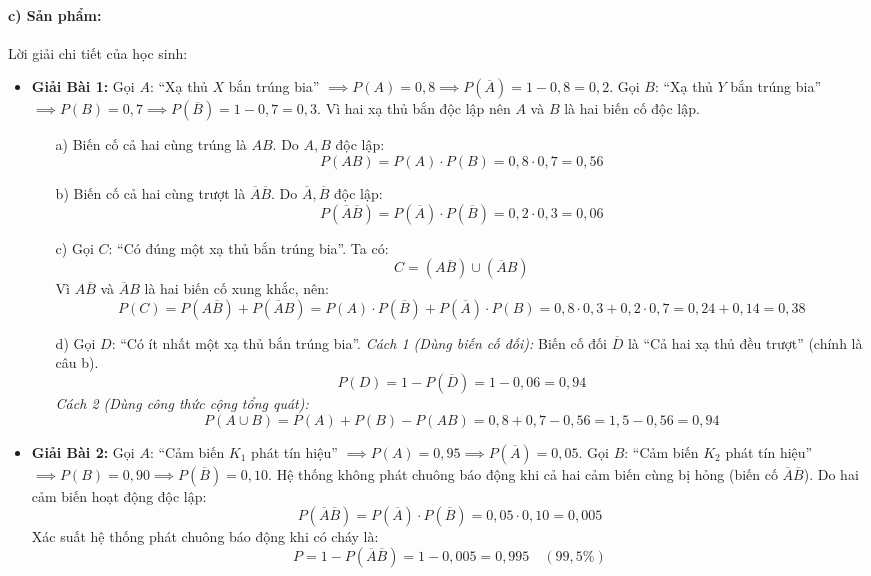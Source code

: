 \documentclass[12pt, a4paper]{article}
\begin{document}
\paragraph{c) Sản phẩm:} Lời giải chi tiết của học sinh:
\begin{itemize}[leftmargin=0.8cm]
    \item \textbf{Giải Bài 1:}
    Gọi $A$: ``Xạ thủ $X$ bắn trúng bia'' $\implies P(A) = 0{,}8 \implies P(\overline{A}) = 1 - 0{,}8 = 0{,}2$.
    Gọi $B$: ``Xạ thủ $Y$ bắn trúng bia'' $\implies P(B) = 0{,}7 \implies P(\overline{B}) = 1 - 0{,}7 = 0{,}3$.
    Vì hai xạ thủ bắn độc lập nên $A$ và $B$ là hai biến cố độc lập.
    \begin{itemize}[leftmargin=0.4cm]
        \item[a)] Biến cố cả hai cùng trúng là $AB$. Do $A, B$ độc lập:
        $$P(AB) = P(A) \cdot P(B) = 0{,}8 \cdot 0{,}7 = 0{,}56$$
        \item[b)] Biến cố cả hai cùng trượt là $\overline{A}\overline{B}$. Do $\overline{A}, \overline{B}$ độc lập:
        $$P(\overline{A}\overline{B}) = P(\overline{A}) \cdot P(\overline{B}) = 0{,}2 \cdot 0{,}3 = 0{,}06$$
        \item[c)] Gọi $C$: ``Có đúng một xạ thủ bắn trúng bia''. Ta có:
        $$C = (A\overline{B}) \cup (\overline{A}B)$$
        Vì $A\overline{B}$ và $\overline{A}B$ là hai biến cố xung khắc, nên:
        $$P(C) = P(A\overline{B}) + P(\overline{A}B) = P(A) \cdot P(\overline{B}) + P(\overline{A}) \cdot P(B) = 0{,}8 \cdot 0{,}3 + 0{,}2 \cdot 0{,}7 = 0{,}24 + 0{,}14 = 0{,}38$$
        \item[d)] Gọi $D$: ``Có ít nhất một xạ thủ bắn trúng bia''.
        \textit{Cách 1 (Dùng biến cố đối):} Biến cố đối $\overline{D}$ là ``Cả hai xạ thủ đều trượt'' (chính là câu b).
        $$P(D) = 1 - P(\overline{D}) = 1 - 0{,}06 = 0{,}94$$
        \textit{Cách 2 (Dùng công thức cộng tổng quát):}
        $$P(A \cup B) = P(A) + P(B) - P(AB) = 0{,}8 + 0{,}7 - 0{,}56 = 1{,}5 - 0{,}56 = 0{,}94$$
    \end{itemize}
    \item \textbf{Giải Bài 2:}
    Gọi $A$: ``Cảm biến $K_1$ phát tín hiệu'' $\implies P(A) = 0{,}95 \implies P(\overline{A}) = 0{,}05$.
    Gọi $B$: ``Cảm biến $K_2$ phát tín hiệu'' $\implies P(B) = 0{,}90 \implies P(\overline{B}) = 0{,}10$.
    Hệ thống không phát chuông báo động khi cả hai cảm biến cùng bị hỏng (biến cố $\overline{A}\overline{B}$).
    Do hai cảm biến hoạt động độc lập:
    $$P(\overline{A}\overline{B}) = P(\overline{A}) \cdot P(\overline{B}) = 0{,}05 \cdot 0{,}10 = 0{,}005$$
    Xác suất hệ thống phát chuông báo động khi có cháy là:
    $$P = 1 - P(\overline{A}\overline{B}) = 1 - 0{,}005 = 0{,}995 \quad (99{,}5\%)$$
\end{itemize}
\end{document}
